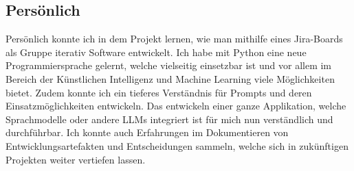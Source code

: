 \subsection{Persönlich}
Persönlich konnte ich in dem Projekt lernen, wie man mithilfe eines Jira-Boards als Gruppe iterativ Software entwickelt.
Ich habe mit Python eine neue Programmiersprache gelernt, welche vielseitig einsetzbar ist und vor allem im Bereich der
Künstlichen Intelligenz und Machine Learning viele Möglichkeiten bietet. Zudem konnte ich ein tieferes Verständnis für
Prompts und deren Einsatzmöglichkeiten entwickeln. Das entwickeln einer ganze Applikation, welche Sprachmodelle oder
andere LLMs integriert ist für mich nun verständlich und durchführbar. Ich konnte auch Erfahrungen im Dokumentieren von
Entwicklungsartefakten und Entscheidungen sammeln, welche sich in zukünftigen Projekten weiter vertiefen lassen. 